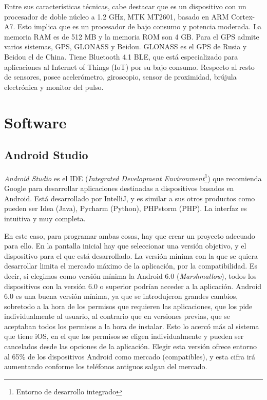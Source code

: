 \documentclass[12pt]{book}
\numberwithin{equation}{section}
\begin{document}
Entre sus características técnicas, cabe destacar que es un dispositivo con un procesador de doble núcleo a 1.2 GHz, MTK MT2601, basado en ARM Cortex-A7. Esto implica que es un procesador de bajo consumo y potencia moderada. La memoria RAM es de 512 MB y la memoria ROM son 4 GB. Para el GPS admite varios sistemas, GPS, GLONASS y Beidou. GLONASS es el GPS de Rusia y Beidou el de China. Tiene Bluetooth 4.1 BLE, que está especializado para aplicaciones al Internet of Things (IoT) por su bajo consumo. Respecto al resto de sensores, posee acelerómetro, giroscopio, sensor de proximidad, brújula electrónica y monitor del pulso.

\section{Software}

\subsection{Android Studio}

\textit{Android Studio} es el IDE (\textit{Integrated Development Environment}\footnote{Entorno de desarrollo integrado}) que recomienda Google para desarrollar aplicaciones destinadas a dispositivos basados en Android. Está desarrollado por IntelliJ, y es similar a sus otros productos como pueden ser Idea (Java), Pycharm (Python), PHPstorm (PHP). La interfaz es intuitiva y muy completa.

En este caso, para programar ambas cosas, hay que crear un proyecto adecuado para ello. En la pantalla inicial hay que seleccionar una versión objetivo, y el dispositivo para el que está desarrollado. La versión mínima con la que  se quiera desarrollar limita el mercado máximo de la aplicación, por la compatibilidad. Es decir, si elegimos como versión mínima la Android 6.0 (\textit{Marshmallow}), todos los dispositivos con la versión 6.0 o superior podrían acceder a la aplicación. Android 6.0 es una buena versión mínima, ya que se introdujeron grandes cambios, sobretodo a la hora de los permisos que requieren las aplicaciones, que los pide individualmente al usuario, al contrario que en versiones previas, que se aceptaban todos los permisos a la hora de instalar. Esto lo acercó más al sistema que tiene iOS, en el que los permisos se eligen individualmente y pueden ser cancelados desde las opciones de la aplicación. Elegir esta versión ofrece entorno al 65\% de los dispositivos Android como mercado (compatibles), y esta cifra irá aumentando conforme los teléfonos antiguos salgan del mercado.
\end{document}
